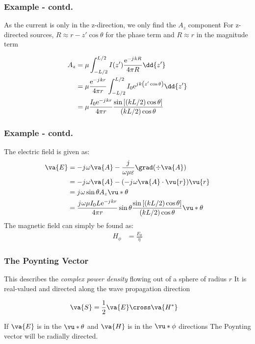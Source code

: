 \documentclass[10pt, compress]{beamer}
\renewcommand{\O}{\omega}  %
\newcommand{\E}{\varepsilon}  %
\renewcommand{\u}{\mu}  %
\newcommand{\e}{\mathrm{e}} %
\renewcommand{\j}{{j}\mkern1mu} %
\begin{document}
\begin{frame}
  \frametitle{Example - contd.}
  \begin{outline}
    \1 As the current is only in the z-direction, we only find the $A_z$ component
    \1 For z-directed sources, $R \approx r - z' \cos \theta$ for the phase term and $R \approx r$ in the magnitude term
  \end{outline}
\begin{align*}
  A_z &= \u \int_{-L/2}^{L/2} I(z') \frac{\e^{-\j k R}}{4 \pi R} \dd{z'} \\
  &= \u \frac{\e^{-\j k r}}{4 \pi r} \int_{-L/2}^{L/2} I_0 \e^{\j k \left(z' \cos \theta\right)} \dd{z'} \\
  &= \u \frac{I_0 \e^{-\j k r}}{4 \pi r} \frac{\sin \left[(kL/2)\cos \theta\right]}{(kL/2)\cos \theta}
\end{align*}
\end{frame}

\begin{frame}
  \frametitle{Example - contd.}
   The electric field is given as:
\begin{align*}
  \va{E} &= - \j \O \va{A} - \frac{\j}{\O \u \E} \grad(\div \va{A}) \\
  &= - \j \O \va{A} - (- \j \O \va{A} \cdot \vu{r})\vu{r} \\
  &= \j \O \sin \theta A_z \vu*{\theta} \\
  &= \frac{\j \O \u I_{0} L \e^{-\j k r}}{4 \pi r} \sin \theta \frac{\sin \left[(k L / 2) \cos \theta\right]}{(k L / 2) \cos \theta} \vu*{\theta}
\end{align*}
The magnetic field can simply be found as:
\begin{align*}
  H_{\phi} &= \frac{E_{\theta}}{\eta}
\end{align*}
\end{frame}

\begin{frame}
  \frametitle{The Poynting Vector}
  \begin{outline}
    \1 This describes the \textit{complex power density} flowing out of a sphere of radius $r$
    \1 It is real-valued and directed along the wave propagation direction
  \end{outline}
  \begin{align*}
    \va{S} &= \frac{1}{2} \va{E} \cross \va{H^{*}}
  \end{align*}
  \begin{outline}
    \1 If $\va{E}$ is in the $\vu*{\theta}$ and $\va{H}$ is in the $\vu*{\phi}$ directions
    \1 The Poynting vector will be radially directed.
  \end{outline}
\end{frame}
\end{document}
